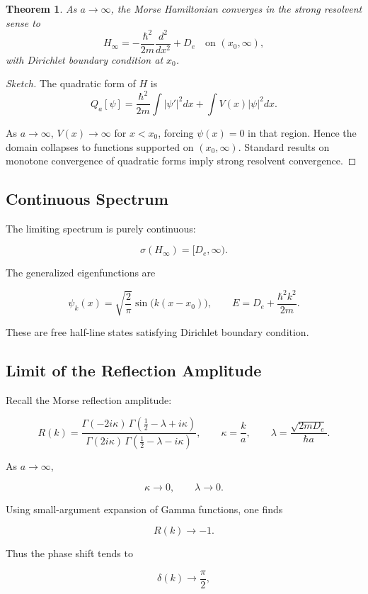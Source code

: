 \documentclass[11pt]{article}
\newtheorem{theorem}{Theorem}
\begin{document}
\begin{theorem}
As $a\to\infty$, the Morse Hamiltonian converges
in the strong resolvent sense to
\[
H_\infty =
-\frac{\hbar^2}{2m}\frac{d^2}{dx^2}
+D_e
\quad \text{on } (x_0,\infty),
\]
with Dirichlet boundary condition at $x_0$.
\end{theorem}

\begin{proof}[Sketch]
The quadratic form of $H$ is
\[
Q_a[\psi]
=
\frac{\hbar^2}{2m}\int |\psi'|^2 dx
+
\int V(x)|\psi|^2 dx.
\]

As $a\to\infty$, $V(x)\to\infty$ for $x<x_0$,
forcing $\psi(x)=0$ in that region.
Hence the domain collapses to functions supported on $(x_0,\infty)$.
Standard results on monotone convergence of quadratic forms
imply strong resolvent convergence.
\end{proof}

\subsection{Continuous Spectrum}

The limiting spectrum is purely continuous:

\[
\sigma(H_\infty)
=
[D_e,\infty).
\]

The generalized eigenfunctions are

\[
\psi_k(x)
=
\sqrt{\frac{2}{\pi}}
\sin\big(k(x-x_0)\big),
\qquad
E=D_e+\frac{\hbar^2 k^2}{2m}.
\]

These are free half-line states satisfying Dirichlet boundary condition.

\subsection{Limit of the Reflection Amplitude}

Recall the Morse reflection amplitude:

\[
R(k)=
\frac{\Gamma(-2i\kappa)
\,\Gamma(\frac12-\lambda+i\kappa)}
{\Gamma(2i\kappa)
\,\Gamma(\frac12-\lambda-i\kappa)},
\qquad
\kappa=\frac{k}{a},
\qquad
\lambda=\frac{\sqrt{2mD_e}}{\hbar a}.
\]

As $a\to\infty$,

\[
\kappa\to 0,
\qquad
\lambda\to 0.
\]

Using small-argument expansion of Gamma functions,
one finds

\[
R(k)\to -1.
\]

Thus the phase shift tends to

\[
\delta(k)\to \frac{\pi}{2},
\]
\end{document}

